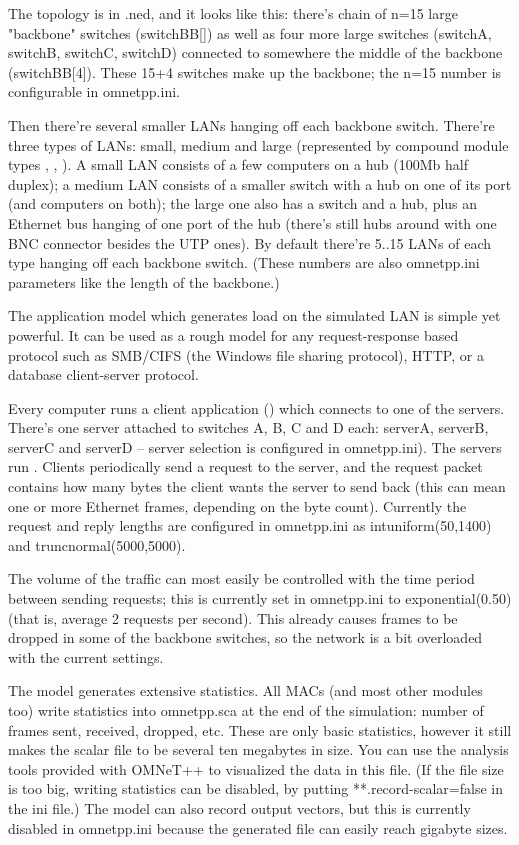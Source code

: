 The topology is in .ned, and it looks like this: there's chain
of n=15 large "backbone" switches (switchBB[]) as well as four more
large switches (switchA, switchB, switchC, switchD) connected to
somewhere the middle of the backbone (switchBB[4]). These 15+4 switches
make up the backbone; the n=15 number is configurable in omnetpp.ini.

Then there're several smaller LANs hanging off each backbone switch.
There're three types of LANs: small, medium and large (represented by
compound module types , , ). A small LAN
consists of a few computers on a hub (100Mb half duplex); a medium
LAN consists of a smaller switch with a hub on one of its port
(and computers on both); the large one also has a switch and a hub,
plus an Ethernet bus hanging of one port of the hub (there's still hubs
around with one BNC connector besides the UTP ones).
By default there're 5..15 LANs of each type hanging off each backbone
switch. (These numbers are also omnetpp.ini parameters like the length
of the backbone.)

The application model which generates load on the simulated LAN is
simple yet powerful. It can be used as a rough model for any
request-response based protocol such as SMB/CIFS (the Windows file
sharing protocol), HTTP, or a database client-server protocol.

Every computer runs a client application () which connects
to one of the servers. There's one server attached to switches A, B,
C and D each: serverA, serverB, serverC and serverD -- server selection
is configured in omnetpp.ini). The servers run .
Clients periodically send a request to the server, and the request
packet contains how many bytes the client wants the server to send back
(this can mean one or more Ethernet frames, depending on the byte count).
 Currently the request and reply lengths are configured in omnetpp.ini
as intuniform(50,1400) and truncnormal(5000,5000).

The volume of the traffic can most easily be controlled with the
time period between sending requests; this is currently
set in omnetpp.ini to exponential(0.50) (that is, average 2
requests per second). This already causes frames to be dropped
in some of the backbone switches, so the network is a bit
overloaded with the current settings.

The model generates extensive statistics. All MACs (and most other
modules too) write statistics into omnetpp.sca at the end
of the simulation: number of frames sent, received, dropped, etc.
These are only basic statistics, however it still makes the
scalar file to be several ten megabytes in size. You can use
the analysis tools provided with OMNeT++ to visualized the data
in this file. (If the file size is too big, writing statistics
can be disabled, by putting **.record-scalar=false in the ini file.)
The model can also record output vectors, but this is currently
disabled in omnetpp.ini because the generated file can easily reach
gigabyte sizes.

